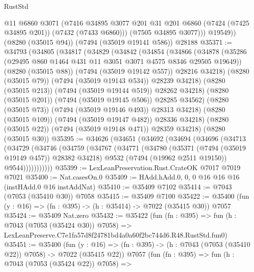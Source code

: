 \begin{lexlean}{RustStd}
\begin{coremodule}
            @11
            @6860
            @3071
            (@7416
              @34895
              @3077
              @201
              @31
              @201
              @6860
              (@7424 (@7425 @34895 @201))
              (@7432 (@7433 @6860)))
            (@7505 @34895 @3077)))
        @19549))
    (@8280 (@35015 @94))
    (@7494 (@35019 @19141 @586))
    @28188
@35371 := @34793
    (@34805
      (@34817
        (@34829
          (@34842
            (@34854
              (@34866
                (@34878
                  (@35286 (@29495 @860 @1464 @431 @11 @3051 @3071 @4575 @8346 @29505 @19649))
                  (@8280 (@35015 @88))
                  (@7494 (@35019 @19142 @557))
                  @28216
                  @34218)
                (@8280 (@35015 @79))
                (@7494 (@35019 @19143 @534))
                @28239
                @34218)
              (@8280 (@35015 @213))
              (@7494 (@35019 @19144 @519))
              @28262
              @34218)
            (@8280 (@35015 @201))
            (@7494 (@35019 @19145 @506))
            @28285
            @34562)
          (@8280 (@35015 @73))
          (@7494 (@35019 @19146 @493))
          @28313
          @34218)
        (@8280 (@35015 @109))
        (@7494 (@35019 @19147 @482))
        @28336
        @34218)
      (@8280 (@35015 @22))
      (@7494 (@35019 @19148 @471))
      @28359
      @34218)
    (@8280 (@35015 @30))
@35395 := @34626
    (@34651
      (@34692
        (@34694
          (@34696
            (@34713
              (@34729
                (@34746
                  (@34759
                    (@34767
                      (@34771
                        (@34780
                          (@35371 (@7494 (@35019 @19149 @457)) @28382 @34218)
                          @9532
                          (@7494 (@19962 @2511 @19150))
                          @9544)))))))))))
@35399 := LexLeanPreservation.Rust.CrateOK @7017 @7019 @7021
@35400 := Nat.casesOn.{0}
@35409 := HAdd.hAdd.{0, 0, 0} @16 @16 @16 (instHAdd.{0} @16 instAddNat)
@35410 := @35409 @7102
@35414 := @7043 (@7053 (@35410 @30)) @7058
@35415 := @35409 @7100
@35422 := @35400 (fun (y : @16) => (fn : @395) -> (h : @35414) -> @7022 (@35415 @30)) @7057
@35424 := @35409 Nat.zero
@35432 := @35422
    (fun (fn : @395) =>
    fun (h : @7043 (@7053 (@35424 @30)) @7058) =>
    LexLeanPreserve.C7e1fa57d8f24781bd4a0a60f2bc744d6.R48.RustStd.fun0)
@35451 := @35400
    (fun (y : @16) => (fn : @395) -> (h : @7043 (@7053 (@35410 @22)) @7058) -> @7022 (@35415 @22))
    @7057
    (fun (fn : @395) =>
    fun (h : @7043 (@7053 (@35424 @22)) @7058) =>

\end{coremodule}
\end{lexlean}
